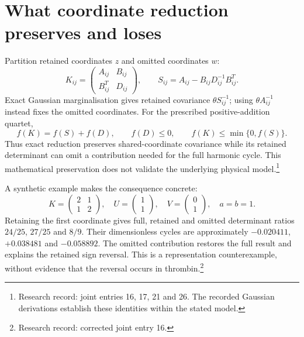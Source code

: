\documentclass{article}
\begin{document}
\section{What coordinate reduction preserves and loses}
Partition retained coordinates \(z\) and omitted coordinates \(w\):
\[
 K_{ij}=\begin{pmatrix}A_{ij}&B_{ij}\\B_{ij}^T&D_{ij}\end{pmatrix},
 \qquad S_{ij}=A_{ij}-B_{ij}D_{ij}^{-1}B_{ij}^T.
\]
Exact Gaussian marginalisation gives retained covariance \(\theta S_{ij}^{-1}\); using \(\theta A_{ij}^{-1}\) instead fixes the omitted coordinates. For the prescribed positive-addition quartet,
\[
 f(K)=f(S)+f(D),\qquad f(D)\le0,
 \qquad f(K)\le\min\{0,f(S)\}.
\]
Thus exact reduction preserves shared-coordinate covariance while its retained determinant can omit a contribution needed for the full harmonic cycle. This mathematical preservation does not validate the underlying physical model.\footnote{Research record: joint entries 16, 17, 21 and 26. The recorded Gaussian derivations establish these identities within the stated model.}

A synthetic example makes the consequence concrete:
\[
 K=\begin{pmatrix}2&1\\1&2\end{pmatrix},\quad
 U=\begin{pmatrix}1\\1\end{pmatrix},\quad
 V=\begin{pmatrix}0\\1\end{pmatrix},\quad a=b=1.
\]
Retaining the first coordinate gives full, retained and omitted determinant ratios \(24/25\), \(27/25\) and \(8/9\). Their dimensionless cycles are approximately \(-0.020411\), \(+0.038481\) and \(-0.058892\). The omitted contribution restores the full result and explains the retained sign reversal. This is a representation counterexample, without evidence that the reversal occurs in thrombin.\footnote{Research record: corrected joint entry 16.}
\end{document}
